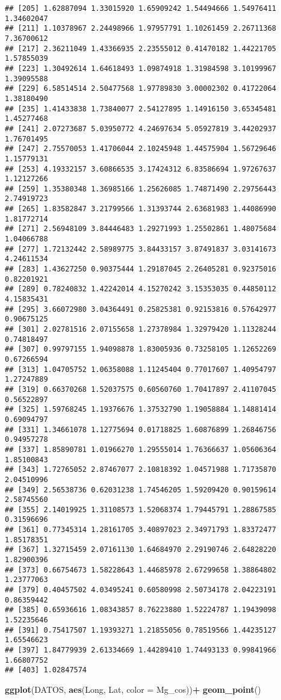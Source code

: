 \documentclass[
]{article}
\newenvironment{Shaded}{\begin{snugshade}}{\end{snugshade}}
\newcommand{\DataTypeTok}[1]{\textcolor[rgb]{0.13,0.29,0.53}{#1}}
\newcommand{\KeywordTok}[1]{\textcolor[rgb]{0.13,0.29,0.53}{\textbf{#1}}}
\newcommand{\NormalTok}[1]{#1}
\newcommand{\OperatorTok}[1]{\textcolor[rgb]{0.81,0.36,0.00}{\textbf{#1}}}
\newcommand{\StringTok}[1]{\textcolor[rgb]{0.31,0.60,0.02}{#1}}
\begin{document}
\begin{verbatim}
## [205] 1.62887094 1.33015920 1.65909242 1.54494666 1.54976411 1.34602047
## [211] 1.10378967 2.24498966 1.97957791 1.10261459 2.26711368 7.36700612
## [217] 2.36211049 1.43366935 2.23555012 0.41470182 1.44221705 1.57855039
## [223] 1.30492614 1.64618493 1.09874918 1.31984598 3.10199967 1.39095588
## [229] 6.58514514 2.50477568 1.97789830 3.00002302 0.41722064 1.38180490
## [235] 1.41433838 1.73840077 2.54127895 1.14916150 3.65345481 1.45277468
## [241] 2.07273687 5.03950772 4.24697634 5.05927819 3.44202937 1.76701495
## [247] 2.75570053 1.41706044 2.10245948 1.44575904 1.56729646 1.15779131
## [253] 4.19332157 3.60866535 3.17424312 6.83586694 1.97267637 1.12127266
## [259] 1.35380348 1.36985166 1.25626085 1.74871490 2.29756443 2.74919723
## [265] 1.83582847 3.21799566 1.31393744 2.63681983 1.44086990 1.81772714
## [271] 2.56948109 3.84446483 1.29271993 1.25502861 1.48075684 1.04066788
## [277] 1.72132442 2.58989775 3.84433157 3.87491837 3.03141673 4.24611534
## [283] 1.43627250 0.90375444 1.29187045 2.26405281 0.92375016 0.82201921
## [289] 0.78240832 1.42242014 4.15270242 3.15353035 0.44850112 4.15835431
## [295] 3.66072980 3.04364491 0.25825381 0.92153816 0.57642977 0.90675125
## [301] 2.02781516 2.07155658 1.27378984 1.32979420 1.11328244 0.74818497
## [307] 0.99797155 1.94098878 1.83005936 0.73258105 1.12652269 0.67266594
## [313] 1.04705752 1.06358088 1.11245404 0.77017607 1.40954797 1.27247889
## [319] 0.66370268 1.52037575 0.60560760 1.70417897 2.41107045 0.56522897
## [325] 1.59768245 1.19376676 1.37532790 1.19058884 1.14881414 0.69094797
## [331] 1.34661078 1.12775694 0.01718825 1.60876899 1.26846756 0.94957278
## [337] 1.85890781 1.01966270 1.29555014 1.76366637 1.05606364 1.85100843
## [343] 1.72765052 2.87467077 2.10818392 1.04571988 1.71735870 2.04510996
## [349] 2.56538736 0.62031238 1.74546205 1.59209420 0.90159614 2.58745560
## [355] 2.14019925 1.31108573 1.52068374 1.79445791 1.28867585 0.31596696
## [361] 0.77345314 1.28161705 3.40897023 2.34971793 1.83372477 1.85178351
## [367] 1.32715459 2.07161130 1.64684970 2.29190746 2.64828220 1.82900396
## [373] 0.66754673 1.58228643 1.44685978 2.67299658 1.38864802 1.23777063
## [379] 0.40457502 4.03495241 0.60580998 2.50734178 2.04223191 0.86359442
## [385] 0.65936616 1.08343857 8.76223880 1.52224787 1.19439098 1.52235646
## [391] 0.75417507 1.19393271 1.21855056 0.78519566 1.44235127 1.65546623
## [397] 1.84779939 2.61334669 1.44289410 1.74493133 0.99841966 1.66807752
## [403] 1.02847574
\end{verbatim}

\begin{Shaded}
\begin{Highlighting}[]
\KeywordTok{ggplot}\NormalTok{(DATOS, }\KeywordTok{aes}\NormalTok{(Long, Lat, }\DataTypeTok{color =}\NormalTok{ Mg_cos))}\OperatorTok{+}
\StringTok{  }\KeywordTok{geom_point}\NormalTok{()}
\end{Highlighting}
\end{Shaded}
\end{document}

